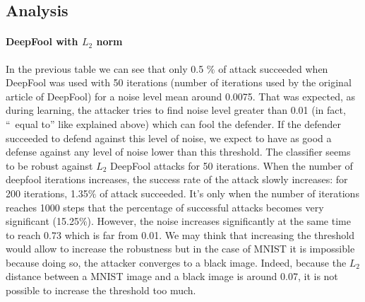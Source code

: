 \documentclass[12pt]{article}
\begin{document}
\begin{center}
\end{center}

\subsection{Analysis}
\paragraph{DeepFool with $L_{2}$ norm}
In the previous table we can see that only 0.5 $\%$ of attack succeeded when DeepFool was used with 50 iterations (number of iterations used by the original article of DeepFool) for a noise level mean around 0.0075. That was expected, as during learning, the attacker tries to find noise level greater than 0.01 (in fact, “~equal to” like explained above) which can fool the defender. If the defender succeeded to defend against this level of noise, we expect to have as good a defense against any level of noise lower than this threshold. The classifier seems to be robust against $L_{2}$ DeepFool attacks for 50 iterations.
When the number of deepfool iterations increases, the success rate of the attack slowly increases: for 200 iterations, 1.35$\%$ of attack succeeded. It’s only when the number of iterations reaches 1000 steps that the percentage of successful attacks becomes very significant (15.25$\%$). However, the noise increases significantly at the same time to reach 0.73 which is far from 0.01.
We may think that increasing the threshold would allow to increase the robustness but in the case of MNIST it is impossible because doing so, the attacker converges to a black image. Indeed, because the $L_{2}$ distance between a MNIST image and a black image is around 0.07, it is not possible to increase the threshold too much.  
\end{document}
